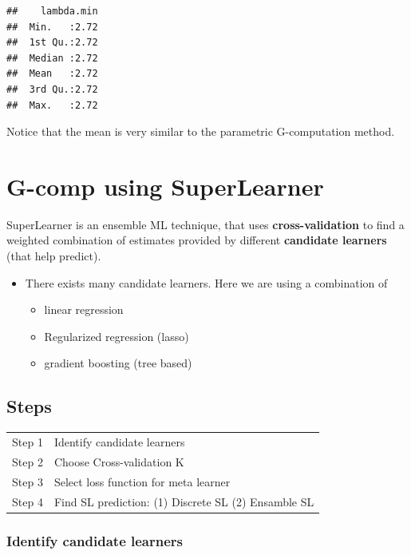 \documentclass[
]{book}
\providecommand{\tightlist}{%
  \setlength{\itemsep}{0pt}\setlength{\parskip}{0pt}}
\begin{document}
\begin{verbatim}
##    lambda.min  
##  Min.   :2.72  
##  1st Qu.:2.72  
##  Median :2.72  
##  Mean   :2.72  
##  3rd Qu.:2.72  
##  Max.   :2.72
\end{verbatim}

Notice that the mean is very similar to the parametric G-computation method.

\hypertarget{g-comp-using-superlearner}{%
\section{G-comp using SuperLearner}\label{g-comp-using-superlearner}}

\begin{rmdcomment}
SuperLearner is an ensemble ML technique, that uses
\textbf{cross-validation} to find a weighted combination of estimates
provided by different \textbf{candidate learners} (that help predict).
\end{rmdcomment}

\begin{itemize}
\tightlist
\item
  There exists many candidate learners. Here we are using a combination of

  \begin{itemize}
  \tightlist
  \item
    linear regression
  \item
    Regularized regression (lasso)
  \item
    gradient boosting (tree based)
  \end{itemize}
\end{itemize}

\hypertarget{steps-1}{%
\subsection{Steps}\label{steps-1}}

\begin{longtable}[]{@{}ll@{}}
\toprule
\endhead
Step 1 & Identify candidate learners\tabularnewline
Step 2 & Choose Cross-validation K\tabularnewline
Step 3 & Select loss function for meta learner\tabularnewline
Step 4 & Find SL prediction: (1) Discrete SL (2) Ensamble SL\tabularnewline
\bottomrule
\end{longtable}

\hypertarget{identify-candidate-learners}{%
\subsubsection{Identify candidate learners}\label{identify-candidate-learners}}
\end{document}
